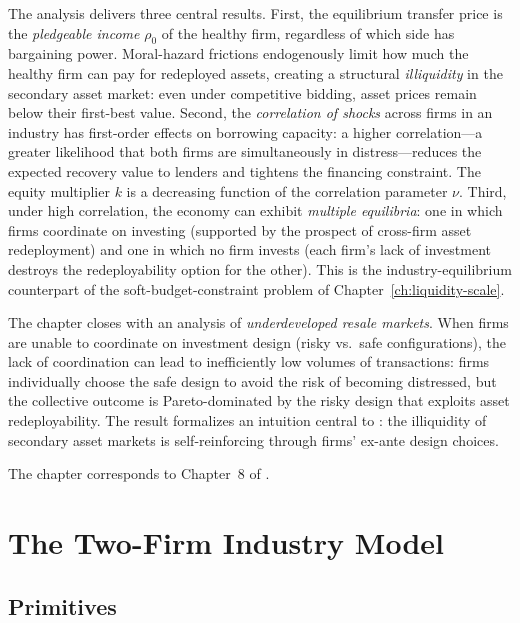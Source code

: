 \documentclass[11pt,a4paper,oneside]{book}
\theoremstyle{plain}
\theoremstyle{definition}
\theoremstyle{remark}
\numberwithin{equation}{chapter}
\begin{document}
The analysis delivers three central results.
First, the equilibrium transfer price is the \emph{pledgeable income} $\rho_0$ of the healthy firm, regardless of which side has bargaining power.
Moral-hazard frictions endogenously limit how much the healthy firm can pay for redeployed assets, creating a structural \emph{illiquidity} in the secondary asset market: even under competitive bidding, asset prices remain below their first-best value.
Second, the \emph{correlation of shocks} across firms in an industry has first-order effects on borrowing capacity: a higher correlation---a greater likelihood that both firms are simultaneously in distress---reduces the expected recovery value to lenders and tightens the financing constraint.
The equity multiplier $k$ is a decreasing function of the correlation parameter $\nu$.
Third, under high correlation, the economy can exhibit \emph{multiple equilibria}: one in which firms coordinate on investing (supported by the prospect of cross-firm asset redeployment) and one in which no firm invests (each firm's lack of investment destroys the redeployability option for the other).
This is the industry-equilibrium counterpart of the soft-budget-constraint problem of Chapter~\ref{ch:liquidity-scale}.

The chapter closes with an analysis of \emph{underdeveloped resale markets}.
When firms are unable to coordinate on investment design (risky vs.\ safe configurations), the lack of coordination can lead to inefficiently low volumes of transactions: firms individually choose the safe design to avoid the risk of becoming distressed, but the collective outcome is Pareto-dominated by the risky design that exploits asset redeployability.
The result formalizes an intuition central to \citet{ShleiferVishny1992}: the illiquidity of secondary asset markets is self-reinforcing through firms' ex-ante design choices.

The chapter corresponds to Chapter~8 of \citet{Tirole2006}.

\section{The Two-Firm Industry Model}
\label{sec:ma-model}

\subsection{Primitives}
\end{document}

